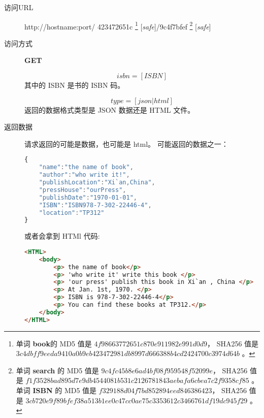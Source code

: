 \documentclass[UTF8]{article}
\def\safe{[\textit{safe}]}
\def\GET{\textbf{GET}}
\def\viaurl{\item[访问URL]}
\def\viareq#1{\item[访问方式] #1}
\def\rtdata{\item[返回数据]}
\begin{document}
                \begin{description}
                    
                    \viaurl http://hostname:port/
                    423472651c
                    \footnote{单词 \textbf{book}的
                        MD5 值是 $4f98663772651c870e911982e991d0d9$，
                        SHA256 值是
                        $3c4dbff9eeda9410a0b9eb423472981db8997d666388b4cd2424700c3974d64b$
                        。
                    }
                    \safe/9c4f7bfef
                    \footnote{
                        单词 \textbf{search} 的
                        MD5 值是 $9c4fc45b8e6ad4bf08f959548f52099e$，
                        SHA256 值是
                        $f1f3528bad895d7e9db4544081b531c2126781843aebafa6cbea7c2f9358cf85$
                        。
                        单词 \textbf{ISBN} 的
                        MD5 值是 $f329188d04f7bd852894eed846386423$，
                        SHA256 值是
                        $3cb720e9f89bfef38a513b1ee0c47cc0ae75c3353612c3466761df19dc945f29$
                        。
                    }
                    \safe
                    
                    
                    \viareq \GET
                    
                    
                    $$isbn=[ISBN]$$
                    其中的 ISBN 是书的 ISBN 码。
                    
                    
                    $$type=[json|html]$$
                    返回的数据格式类型是 JSON 数据还是 HTML 文件。
                    
                    \rtdata 请求返回的可能是数据，也可能是 html。
                    可能返回的数据之一：
                    \begin{lstlisting}[language=JavaScript]
{
    "name":"the name of book",
    "author":"who write it!",
    "publishLocation":"Xi`an,China",
    "pressHouse":"ourPress",
    "publishDate":"1970-01-01",
    "ISBN":"ISBN978-7-302-22446-4",
    "location":"TP312"
}
                    \end{lstlisting}
                    或者会拿到 HTMl 代码:
                    \begin{lstlisting}[language=HTML]
<HTML>
    <body>
        <p> the name of book</p>
        <p> 'who write it' write this book </p>
        <p> 'our press' publish this book in Xi`an , China </p>
        <p> At Jan. 1st, 1970. </p>
        <p> ISBN is 978-7-302-22446-4</p>
        <p> You can find these books at TP312.</p>
    </body>
</HTML>
                    \end{lstlisting}
                \end{description}
\end{document}
